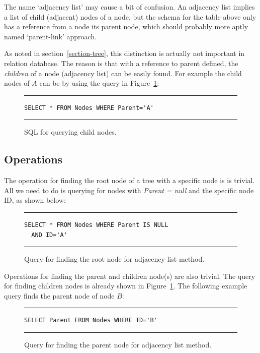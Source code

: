 \begin{remark}[Note:]
The name `adjacency list' may cause a bit of confusion. An adjacency list implies a list of child (adjacent) nodes of a node, but the schema for the table above only has a reference from a node its parent node, which should probably more aptly named `parent-link' approach.

As noted in section~\ref{section-tree}, this distinction is actually not important in relation database. The reason is that with a reference to parent defined, the {\em children} of a node (adjacency list) can be easily found. For example the child nodes of $A$ can be by using the query in Figure~\ref{fig:child_query}:

\begin{figure}[h]
\hrule\vspace{6px}
\begin{verbatim}
SELECT * FROM Nodes WHERE Parent='A'
\end{verbatim}
\hrule
\caption{SQL for querying child nodes.\label{fig:child_query}}
\end{figure}
\end{remark}

\subsection{Operations}

The operation for finding the root node of a tree with a specific node is is trivial. All we need to do is querying for nodes with \emph{Parent = null} and the specific node ID, as shown below:

\begin{figure}[h]
\hrule\vspace{6px}
\begin{verbatim}
SELECT * FROM Nodes WHERE Parent IS NULL
  AND ID='A'
\end{verbatim}
\hrule
\caption{Query for finding the root node for adjacency list method.\label{fig:adj_list_find_root}}
\end{figure}

Operations for finding the parent and children node(s) are also trivial. The query for finding children nodes is already shown in Figure~\ref{fig:child_query}. The following example query finds the parent node of node $B$:

\begin{figure}[h]
\hrule\vspace{6px}
\begin{verbatim}
SELECT Parent FROM Nodes WHERE ID='B'
\end{verbatim}
\hrule
\caption{Query for finding the parent node for adjacency list method.\label{fig:adj_list_find_parent}}
\end{figure}

